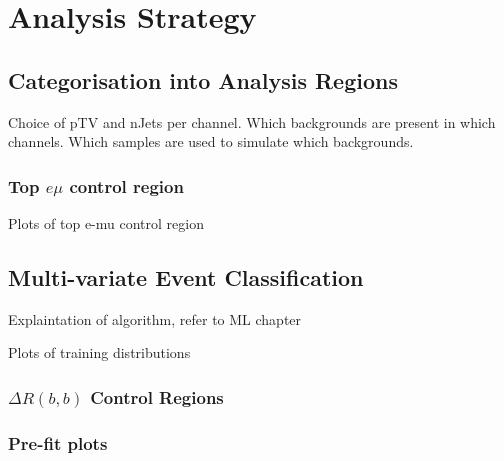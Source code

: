 \chapter{Analysis Strategy}%
\label{ch:strategy}
\section{Categorisation into Analysis Regions}
\label{sec:ana-regions}
Choice of pTV and nJets per channel.
Which backgrounds are present in which channels.
Which samples are used to simulate which backgrounds.
\subsection{Top \texorpdfstring{$e \mu$}{e mu} control region}%
\label{sec:topemucr}
Plots of top e-mu control region
\section{Multi-variate Event Classification}%
\label{sec:mva}
Explaintation of algorithm, refer to ML chapter

Plots of training distributions
\subsection{\texorpdfstring{$\Delta R(b,b)$}{DRbb} Control Regions}%
\label{sec:control-region-defintions}

\subsection{Pre-fit plots}











